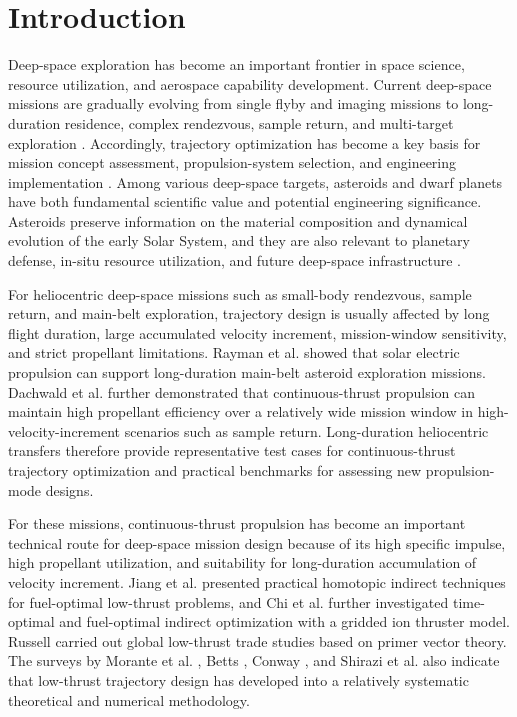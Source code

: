 \documentclass{IEEEtaes}
\begin{document}
\section{Introduction}
Deep-space exploration has become an important frontier in space science, resource utilization, and aerospace capability development. Current deep-space missions are gradually evolving from single flyby and imaging missions to long-duration residence, complex rendezvous, sample return, and multi-target exploration \cite{racca2003}. Accordingly, trajectory optimization has become a key basis for mission concept assessment, propulsion-system selection, and engineering implementation \cite{vasile2006}. Among various deep-space targets, asteroids and dwarf planets have both fundamental scientific value and potential engineering significance. Asteroids preserve information on the material composition and dynamical evolution of the early Solar System, and they are also relevant to planetary defense, in-situ resource utilization, and future deep-space infrastructure \cite{azadmanesh2023}.

For heliocentric deep-space missions such as small-body rendezvous, sample return, and main-belt exploration, trajectory design is usually affected by long flight duration, large accumulated velocity increment, mission-window sensitivity, and strict propellant limitations. Rayman et al. \cite{rayman2006} showed that solar electric propulsion can support long-duration main-belt asteroid exploration missions. Dachwald et al. \cite{dachwald2008} further demonstrated that continuous-thrust propulsion can maintain high propellant efficiency over a relatively wide mission window in high-velocity-increment scenarios such as sample return. Long-duration heliocentric transfers therefore provide representative test cases for continuous-thrust trajectory optimization and practical benchmarks for assessing new propulsion-mode designs.

For these missions, continuous-thrust propulsion has become an important technical route for deep-space mission design because of its high specific impulse, high propellant utilization, and suitability for long-duration accumulation of velocity increment. Jiang et al. \cite{jiang2012} presented practical homotopic indirect techniques for fuel-optimal low-thrust problems, and Chi et al. \cite{chi2022} further investigated time-optimal and fuel-optimal indirect optimization with a gridded ion thruster model. Russell \cite{russell2007} carried out global low-thrust trade studies based on primer vector theory. The surveys by Morante et al. \cite{morante2021}, Betts \cite{betts1998}, Conway \cite{conway2012}, and Shirazi et al. \cite{shirazi2018} also indicate that low-thrust trajectory design has developed into a relatively systematic theoretical and numerical methodology.
\end{document}
